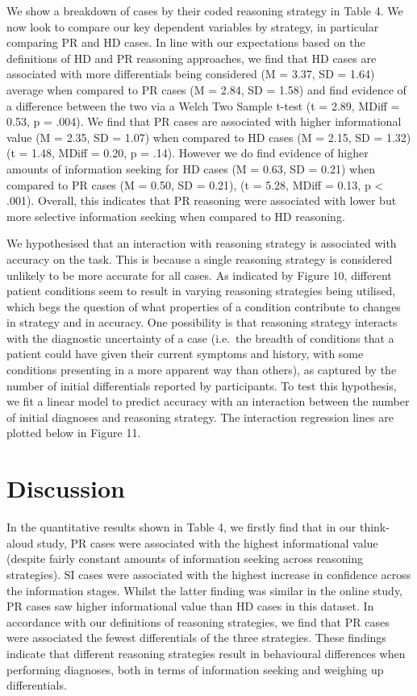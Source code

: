 \documentclass[a4paper, nobind]{templates/ociamthesis}
\begin{document}
We show a breakdown of cases by their coded reasoning strategy in Table 4. We now look to compare our key dependent variables by strategy, in particular comparing PR and HD cases. In line with our expectations based on the definitions of HD and PR reasoning approaches, we find that HD cases are associated with more differentials being considered (M = 3.37, SD = 1.64) average when compared to PR cases (M = 2.84, SD = 1.58) and find evidence of a difference between the two via a Welch Two Sample t-test (t = 2.89, MDiff = 0.53, p = .004). We find that PR cases are associated with higher informational value (M = 2.35, SD = 1.07) when compared to HD cases (M = 2.15, SD = 1.32) (t = 1.48, MDiff = 0.20, p = .14). However we do find evidence of higher amounts of information seeking for HD cases (M = 0.63, SD = 0.21) when compared to PR cases (M = 0.50, SD = 0.21), (t = 5.28, MDiff = 0.13, p \textless{} .001). Overall, this indicates that PR reasoning were associated with lower but more selective information seeking when compared to HD reasoning.

We hypothesised that an interaction with reasoning strategy is associated with accuracy on the task. This is because a single reasoning strategy is considered unlikely to be more accurate for all cases. As indicated by Figure 10, different patient conditions seem to result in varying reasoning strategies being utilised, which begs the question of what properties of a condition contribute to changes in strategy and in accuracy. One possibility is that reasoning strategy interacts with the diagnostic uncertainty of a case (i.e.~the breadth of conditions that a patient could have given their current symptoms and history, with some conditions presenting in a more apparent way than others), as captured by the number of initial differentials reported by participants. To test this hypothesis, we fit a linear model to predict accuracy with an interaction between the number of initial diagnoses and reasoning strategy. The interaction regression lines are plotted below in Figure 11.

\section*{Discussion}\label{discussion-1}

In the quantitative results shown in Table 4, we firstly find that in our think-aloud study, PR cases were associated with the highest informational value (despite fairly constant amounts of information seeking across reasoning strategies). SI cases were associated with the highest increase in confidence across the information stages. Whilst the latter finding was similar in the online study, PR cases saw higher informational value than HD cases in this dataset. In accordance with our definitions of reasoning strategies, we find that PR cases were associated the fewest differentials of the three strategies. These findings indicate that different reasoning strategies result in behavioural differences when performing diagnoses, both in terms of information seeking and weighing up differentials.
\end{document}

